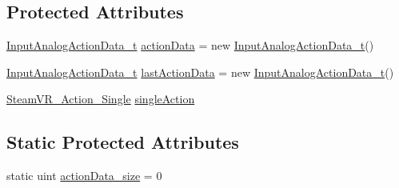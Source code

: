 \subsection*{Protected Attributes}
\begin{DoxyCompactItemize}
\item 
\mbox{\hyperlink{struct_valve_1_1_v_r_1_1_input_analog_action_data__t}{Input\+Analog\+Action\+Data\+\_\+t}} \mbox{\hyperlink{class_valve_1_1_v_r_1_1_steam_v_r___action___single___source_aacc98af87fc1a33c3e396299056b88f6}{action\+Data}} = new \mbox{\hyperlink{struct_valve_1_1_v_r_1_1_input_analog_action_data__t}{Input\+Analog\+Action\+Data\+\_\+t}}()
\item 
\mbox{\hyperlink{struct_valve_1_1_v_r_1_1_input_analog_action_data__t}{Input\+Analog\+Action\+Data\+\_\+t}} \mbox{\hyperlink{class_valve_1_1_v_r_1_1_steam_v_r___action___single___source_a638b9b62737ae9081072d9d0fdaf8ba3}{last\+Action\+Data}} = new \mbox{\hyperlink{struct_valve_1_1_v_r_1_1_input_analog_action_data__t}{Input\+Analog\+Action\+Data\+\_\+t}}()
\item 
\mbox{\hyperlink{class_valve_1_1_v_r_1_1_steam_v_r___action___single}{Steam\+V\+R\+\_\+\+Action\+\_\+\+Single}} \mbox{\hyperlink{class_valve_1_1_v_r_1_1_steam_v_r___action___single___source_aacf8c5124aa932372872a6ebcd4732f3}{single\+Action}}
\end{DoxyCompactItemize}
\subsection*{Static Protected Attributes}
\begin{DoxyCompactItemize}
\item 
static uint \mbox{\hyperlink{class_valve_1_1_v_r_1_1_steam_v_r___action___single___source_afca656d11a1f6a78196292e8b1869837}{action\+Data\+\_\+size}} = 0
\end{DoxyCompactItemize}
